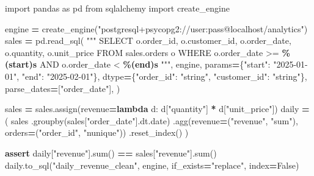 \documentclass[
  12pt,
]{article}
\newenvironment{Shaded}{\begin{snugshade}}{\end{snugshade}}
\newcommand{\BuiltInTok}[1]{#1}
\newcommand{\ControlFlowTok}[1]{\textcolor[rgb]{0.13,0.29,0.53}{\textbf{#1}}}
\newcommand{\ImportTok}[1]{#1}
\newcommand{\KeywordTok}[1]{\textcolor[rgb]{0.13,0.29,0.53}{\textbf{#1}}}
\newcommand{\NormalTok}[1]{#1}
\newcommand{\OperatorTok}[1]{\textcolor[rgb]{0.81,0.36,0.00}{\textbf{#1}}}
\newcommand{\SpecialCharTok}[1]{\textcolor[rgb]{0.81,0.36,0.00}{\textbf{#1}}}
\newcommand{\StringTok}[1]{\textcolor[rgb]{0.31,0.60,0.02}{#1}}
\newcommand{\VariableTok}[1]{\textcolor[rgb]{0.00,0.00,0.00}{#1}}
\begin{document}
\begin{Shaded}
\begin{Highlighting}[]
\ImportTok{import}\NormalTok{ pandas }\ImportTok{as}\NormalTok{ pd}
\ImportTok{from}\NormalTok{ sqlalchemy }\ImportTok{import}\NormalTok{ create\_engine}

\NormalTok{engine }\OperatorTok{=}\NormalTok{ create\_engine(}\StringTok{"postgresql+psycopg2://user:pass@localhost/analytics"}\NormalTok{)}
\NormalTok{sales }\OperatorTok{=}\NormalTok{ pd.read\_sql(}
    \StringTok{"""}
\StringTok{    SELECT o.order\_id, o.customer\_id, o.order\_date, o.quantity, o.unit\_price}
\StringTok{    FROM sales.orders o}
\StringTok{    WHERE o.order\_date \textgreater{}= }\SpecialCharTok{\%(start)s}\StringTok{ AND o.order\_date \textless{} }\SpecialCharTok{\%(end)s}
\StringTok{    """}\NormalTok{,}
\NormalTok{    engine,}
\NormalTok{    params}\OperatorTok{=}\NormalTok{\{}\StringTok{"start"}\NormalTok{: }\StringTok{"2025{-}01{-}01"}\NormalTok{, }\StringTok{"end"}\NormalTok{: }\StringTok{"2025{-}02{-}01"}\NormalTok{\},}
\NormalTok{    dtype}\OperatorTok{=}\NormalTok{\{}\StringTok{"order\_id"}\NormalTok{: }\StringTok{"string"}\NormalTok{, }\StringTok{"customer\_id"}\NormalTok{: }\StringTok{"string"}\NormalTok{\},}
\NormalTok{    parse\_dates}\OperatorTok{=}\NormalTok{[}\StringTok{"order\_date"}\NormalTok{],}
\NormalTok{)}

\NormalTok{sales }\OperatorTok{=}\NormalTok{ sales.assign(revenue}\OperatorTok{=}\KeywordTok{lambda}\NormalTok{ d: d[}\StringTok{"quantity"}\NormalTok{] }\OperatorTok{*}\NormalTok{ d[}\StringTok{"unit\_price"}\NormalTok{])}
\NormalTok{daily }\OperatorTok{=}\NormalTok{ (}
\NormalTok{    sales}
\NormalTok{    .groupby(sales[}\StringTok{"order\_date"}\NormalTok{].dt.date)}
\NormalTok{    .agg(revenue}\OperatorTok{=}\NormalTok{(}\StringTok{"revenue"}\NormalTok{, }\StringTok{"sum"}\NormalTok{), orders}\OperatorTok{=}\NormalTok{(}\StringTok{"order\_id"}\NormalTok{, }\StringTok{"nunique"}\NormalTok{))}
\NormalTok{    .reset\_index()}
\NormalTok{)}

\ControlFlowTok{assert}\NormalTok{ daily[}\StringTok{"revenue"}\NormalTok{].}\BuiltInTok{sum}\NormalTok{() }\OperatorTok{==}\NormalTok{ sales[}\StringTok{"revenue"}\NormalTok{].}\BuiltInTok{sum}\NormalTok{()}
\NormalTok{daily.to\_sql(}\StringTok{"daily\_revenue\_clean"}\NormalTok{, engine, if\_exists}\OperatorTok{=}\StringTok{"replace"}\NormalTok{, index}\OperatorTok{=}\VariableTok{False}\NormalTok{)}
\end{Highlighting}
\end{Shaded}
\end{document}
